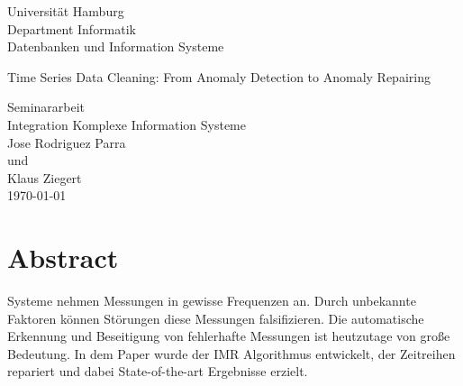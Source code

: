\documentclass[12pt,twoside]{article}
\newcommand{\trtype}{Seminararbeit} %
\newcommand{\trcourse}{Integration Komplexe Information Systeme}
\newcommand{\trtitle}{Time Series Data Cleaning: From Anomaly Detection to
Anomaly Repairing}
\newcommand{\trarbeitsbereich}{Datenbanken und Information Systeme}
\newcommand{\trdate}{\today}
\theoremstyle{plain}
\theoremstyle{definition}
\theoremstyle{remark}
\begin{document}
\renewcommand{\headheight}{14.5pt}

\begin{titlepage}
	\begin{flushleft}
		Universit\"at Hamburg\\
		Department Informatik\\
		\trarbeitsbereich\\
	\end{flushleft}
	\vspace{2.5cm}
	\begin{center}
		\huge \trtitle\\
	\end{center}
	\vspace{1.5cm}
	\begin{center}
		\normalsize\trtype\\
		[0.2cm]
		\Large\trcourse\\
		[1.0cm]
        \normalsize Jose Rodriguez Parra\\
		[0.2cm]
    und\\
		[0.2cm]
        \normalsize Klaus Ziegert \\
		[0.2cm]
		\Large \trdate
	\end{center}
	\vfill
\end{titlepage}

\thispagestyle{empty}
\hspace{1cm}



\section*{Abstract}
 Systeme nehmen Messungen in gewisse Frequenzen an. Durch unbekannte Faktoren
 können Störungen diese Messungen falsifizieren. Die automatische Erkennung und
 Beseitigung von fehlerhafte Messungen ist heutzutage von große Bedeutung. In
 dem Paper wurde der IMR Algorithmus entwickelt, der Zeitreihen repariert und
 dabei State-of-the-art Ergebnisse erzielt.

\newpage
\setcounter{tocdepth}{3}%
\tableofcontents
{}
\newpage

\end{document}
